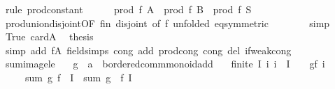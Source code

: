 \begin{isabellebody}
\ {\isacharparenleft}{\kern0pt}rule\ prod{\isacharunderscore}{\kern0pt}constant{\isacharparenright}{\kern0pt}\isanewline
\ \ \ \ \isamarkupfalse%
\ {\isachardoublequoteopen}prod\ {\isacharquery}{\kern0pt}f\ {\isacharquery}{\kern0pt}A\ {\isacharasterisk}{\kern0pt}\ prod\ {\isacharquery}{\kern0pt}f\ {\isacharquery}{\kern0pt}B\ {\isacharequal}{\kern0pt}\ prod\ {\isacharquery}{\kern0pt}f\ S{\isachardoublequoteclose}\isanewline
\ \ \ \ \ \ \isamarkupfalse%
\ prod{\isachardot}{\kern0pt}union{\isacharunderscore}{\kern0pt}disjoint{\isacharbrackleft}{\kern0pt}OF\ fin{\isacharprime}{\kern0pt}\ disjoint{\isacharcomma}{\kern0pt}\ of\ {\isacharquery}{\kern0pt}f{\isacharcomma}{\kern0pt}\ unfolded\ eq{\isacharbrackleft}{\kern0pt}symmetric{\isacharbrackright}{\kern0pt}{\isacharbrackright}{\kern0pt}\isanewline
\ \ \ \ \ \ \isamarkupfalse%
\ simp\isanewline
\ \ \ \ \isamarkupfalse%
\ True\ card{\isacharunderscore}{\kern0pt}A\ \isamarkupfalse%
\ {\isacharquery}{\kern0pt}thesis\isanewline
\ \ \ \ \ \ \isamarkupfalse%
\ {\isacharparenleft}{\kern0pt}simp\ add{\isacharcolon}{\kern0pt}\ f{\isacharunderscore}{\kern0pt}A{}\ field{\isacharunderscore}{\kern0pt}simps\ cong\ add{\isacharcolon}{\kern0pt}\ prod{\isachardot}{\kern0pt}cong\ cong\ del{\isacharcolon}{\kern0pt}\ if{\isacharunderscore}{\kern0pt}weak{\isacharunderscore}{\kern0pt}cong{\isacharparenright}{\kern0pt}\isanewline
\ \ \isamarkupfalse%
\isanewline
{}\isamarkupfalse%
%
\endisatagproof
{\isafoldproof}%
%
\isadelimproof
\isanewline
%
\endisadelimproof
\isanewline
{}\isamarkupfalse%
\ sum{\isacharunderscore}{\kern0pt}image{\isacharunderscore}{\kern0pt}le{\isacharcolon}{\kern0pt}\isanewline
\ \ \ g\ {\isacharcolon}{\kern0pt}{\isacharcolon}{\kern0pt}\ {\isachardoublequoteopen}{\isacharprime}{\kern0pt}a\ {\isasymRightarrow}\ {\isacharprime}{\kern0pt}b{\isacharcolon}{\kern0pt}{\isacharcolon}{\kern0pt}ordered{\isacharunderscore}{\kern0pt}comm{\isacharunderscore}{\kern0pt}monoid{\isacharunderscore}{\kern0pt}add{\isachardoublequoteclose}\isanewline
\ \ \ {\isachardoublequoteopen}finite\ I{\isachardoublequoteclose}\ {\isachardoublequoteopen}{\isasymAnd}i{\isachardot}{\kern0pt}\ i\ {\isasymin}\ I\ {\isasymLongrightarrow}\ {}\ {\isasymle}\ g{\isacharparenleft}{\kern0pt}f\ i{\isacharparenright}{\kern0pt}{\isachardoublequoteclose}\isanewline
\ \ \ \ \ {\isachardoublequoteopen}sum\ g\ {\isacharparenleft}{\kern0pt}f\ {\isacharbackquote}{\kern0pt}\ I{\isacharparenright}{\kern0pt}\ {\isasymle}\ sum\ {\isacharparenleft}{\kern0pt}g\ {\isasymcirc}\ f{\isacharparenright}{\kern0pt}\ I{\isachardoublequoteclose}\isanewline

\end{isabellebody}
